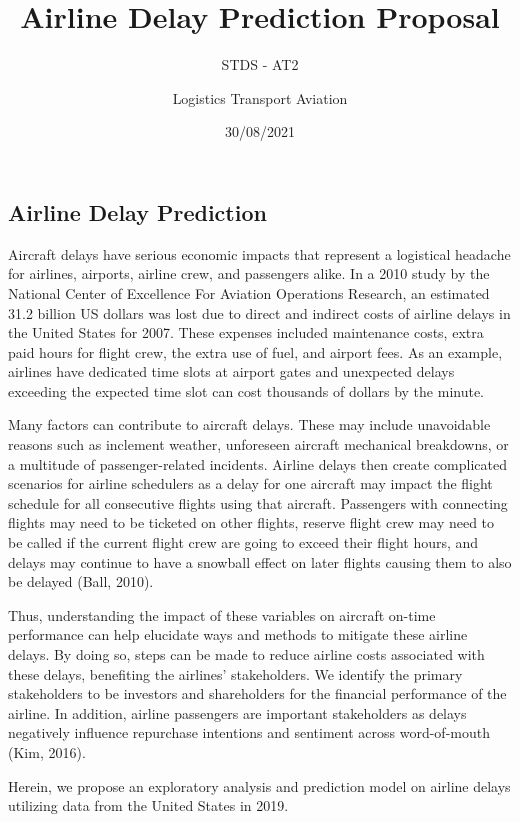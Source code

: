\documentclass[
]{article}
\title{Airline Delay Prediction Proposal}
\subtitle{STDS - AT2}
\author{Logistics Transport Aviation}
\date{30/08/2021}
\begin{document}
\maketitle

{
\setcounter{tocdepth}{3}
\tableofcontents
}
\hypertarget{airline-delay-prediction}{%
\subsection{Airline Delay Prediction}\label{airline-delay-prediction}}

Aircraft delays have serious economic impacts that represent a
logistical headache for airlines, airports, airline crew, and passengers
alike. In a 2010 study by the National Center of Excellence For Aviation
Operations Research, an estimated 31.2 billion US dollars was lost due
to direct and indirect costs of airline delays in the United States for
2007. These expenses included maintenance costs, extra paid hours for
flight crew, the extra use of fuel, and airport fees. As an example,
airlines have dedicated time slots at airport gates and unexpected
delays exceeding the expected time slot can cost thousands of dollars by
the minute.

Many factors can contribute to aircraft delays. These may include
unavoidable reasons such as inclement weather, unforeseen aircraft
mechanical breakdowns, or a multitude of passenger-related incidents.
Airline delays then create complicated scenarios for airline schedulers
as a delay for one aircraft may impact the flight schedule for all
consecutive flights using that aircraft. Passengers with connecting
flights may need to be ticketed on other flights, reserve flight crew
may need to be called if the current flight crew are going to exceed
their flight hours, and delays may continue to have a snowball effect on
later flights causing them to also be delayed (Ball, 2010).

Thus, understanding the impact of these variables on aircraft on-time
performance can help elucidate ways and methods to mitigate these
airline delays. By doing so, steps can be made to reduce airline costs
associated with these delays, benefiting the airlines' stakeholders. We
identify the primary stakeholders to be investors and shareholders for
the financial performance of the airline. In addition, airline
passengers are important stakeholders as delays negatively influence
repurchase intentions and sentiment across word-of-mouth (Kim, 2016).

Herein, we propose an exploratory analysis and prediction model on
airline delays utilizing data from the United States in 2019.
\end{document}
